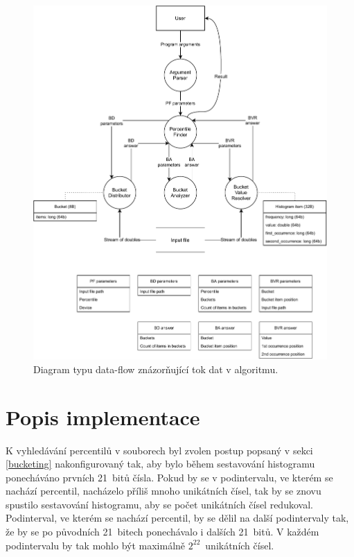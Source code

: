 \documentclass[12pt, a4paper]{article}
\newcommand{\bucketingparamone}{21}
\newcommand{\bucketingparamtwo}{21}
\newcommand{\bucketingparamthree}{22}
\let\oldsection\section
\renewcommand\section{\clearpage\oldsection}
\begin{document}
\begin{figure}[!ht]
    \centering 
    \includegraphics[width=1.038125\textwidth]{pdf/dfd.pdf}
    \caption{Diagram typu data-flow znázorňující tok dat v algoritmu.}
\end{figure}


\section{Popis implementace}

K vyhledávání percentilů v souborech byl zvolen postup popsaný v sekci \ref{bucketing} nakonfigurovaný tak, aby bylo během sestavování histogramu ponecháváno prvních \bucketingparamone~bitů čísla.
Pokud by se v podintervalu, ve kterém se nachází percentil, nacházelo příliš mnoho unikátních čísel, tak by se znovu spustilo sestavování histogramu, aby se počet unikátních čísel redukoval. 
Podinterval, ve kterém se nachází percentil, by se dělil na další podintervaly tak, že by se po původních \bucketingparamone~bitech ponechávalo i dalších \bucketingparamtwo~bitů. 
V každém podintervalu by tak mohlo být maximálně $2^{\bucketingparamthree}$~unikátních čísel.
\end{document}
